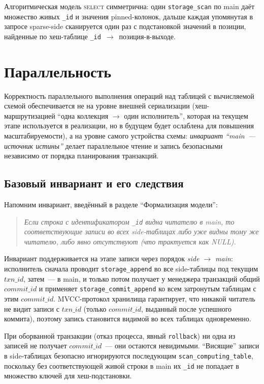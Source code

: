 Алгоритмическая модель \textsc{select} симметрична: один
\texttt{storage\_scan} по main даёт множество живых \texttt{\_id} и
значения pinned-колонок, дальше каждая упомянутая в запросе
sparse-side сканируется один раз с подстановкой значений в
позиции, найденные по хеш-таблице
\texttt{\_id}~$\to$~позиция-в-выходе.

\section{Параллельность}\label{sec:parallel}

Корректность параллельного выполнения операций над таблицей с
вычисляемой схемой обеспечивается не на уровне внешней сериализации
(хеш-маршрутизацией ``одна коллекция $\to$ один исполнитель'',
которая на текущем этапе используется в реализации, но в будущем
будет ослаблена для повышения масштабируемости), а на уровне самого
устройства схемы: \emph{инвариант ``main~--- источник истины''}
делает параллельное чтение и запись безопасными независимо от
порядка планирования транзакций.

\subsection{Базовый инвариант и его следствия}

Напомним инвариант, введённый в разделе ``Формализация модели'':
\begin{quote}\itshape
Если строка с идентификатором \texttt{\_id} видна читателю в main,
то соответствующие записи во всех side-таблицах либо уже видны тому
же читателю, либо явно отсутствуют (что трактуется как NULL).
\end{quote}

Инвариант поддерживается на этапе записи через порядок
\emph{side $\to$ main}: исполнитель сначала проводит
\texttt{storage\_append} во все side-таблицы под текущим
$\mathit{txn\_id}$, затем~--- в main, и только потом получает у
менеджера транзакций общий $\mathit{commit\_id}$ и применяет
\texttt{storage\_commit\_append} ко всем затронутым таблицам с этим
$\mathit{commit\_id}$. MVCC-протокол хранилища гарантирует, что
никакой читатель не видит записи с $\mathit{txn\_id}$ (только
$\mathit{commit\_id}$, выданный после успешного коммита), поэтому
запись становится видимой во всех таблицах одновременно.

При оборванной транзакции (отказ процесса, явный
\texttt{rollback}) ни одна из записей не получает
$\mathit{commit\_id}$~--- они остаются невидимыми. ``Висящие''
записи в side-таблицах безопасно игнорируются последующим
\texttt{scan\_computing\_table}, поскольку без соответствующей
живой строки в main их \texttt{\_id} не попадает в множество ключей
для хеш-подстановки.

